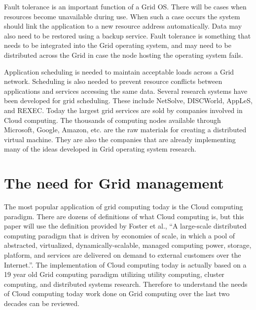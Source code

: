 \documentclass[conference]{IEEEtran}
\begin{document}
Fault tolerance is an important function of a Grid OS. There will be cases when resources become unavailable during use. When such a case occurs the system should link the application to a new resource address automatically. Data may also need to be restored using a backup service. Fault tolerance is something that needs to be integrated into the Grid operating system, and may need to be distributed across the Grid in case the node hosting the operating system fails.  

Application scheduling is needed to maintain acceptable loads across a Grid network. Scheduling is also needed to prevent resource conflicts between applications and services accessing the same data. Several research systems have been developed for grid scheduling. These include NetSolve, DISCWorld, AppLeS, and REXEC. \cite{nimrod} Today the largest grid services are sold by companies involved in Cloud computing. The thousands of computing nodes available through Microsoft, Google, Amazon, etc. are the raw materials for creating a distributed virtual machine. They are also the companies that are already implementing many of the ideas developed in Grid operating system research.  

\section{\textbf{The need for Grid management}}
The most popular application of grid computing today is the Cloud computing paradigm. There are dozens of definitions of what Cloud computing is, but this paper will use the definition provided by Foster et al., ``A large-scale distributed computing paradigm that is driven by economies of scale, in which a pool of abstracted, virtualized, dynamically-scalable, managed computing power, storage, platform, and services are delivered on demand to external customers over the Internet.''. \cite{cloudgridcompute} The implementation of Cloud computing today is actually based on a 19 year old Grid computing paradigm utilizing utility computing, cluster computing, and distributed systems research. Therefore to understand the needs of Cloud computing today work done on Grid computing over the last two decades can be reviewed. 
\end{document}
